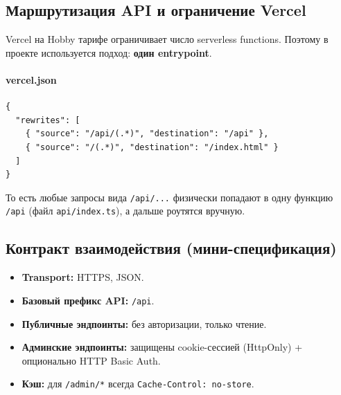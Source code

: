 \documentclass[12pt,a4paper]{article}
\begin{document}
\begin{center}
\end{center}

\subsection{Маршрутизация API и ограничение Vercel}
Vercel на Hobby тарифе ограничивает число serverless functions. Поэтому в проекте используется подход: \textbf{один entrypoint}.

\paragraph{vercel.json}
\begin{verbatim}
{
  "rewrites": [
    { "source": "/api/(.*)", "destination": "/api" },
    { "source": "/(.*)", "destination": "/index.html" }
  ]
}
\end{verbatim}

То есть любые запросы вида \texttt{/api/...} физически попадают в одну функцию \texttt{/api} (файл \texttt{api/index.ts}), а дальше роутятся вручную.

\subsection{Контракт взаимодействия (мини-спецификация)}
\begin{itemize}[leftmargin=18pt]
  \item \textbf{Transport:} HTTPS, JSON.
  \item \textbf{Базовый префикс API:} \texttt{/api}.
  \item \textbf{Публичные эндпоинты:} без авторизации, только чтение.
  \item \textbf{Админские эндпоинты:} защищены cookie-сессией (HttpOnly) + опционально HTTP Basic Auth.
  \item \textbf{Кэш:} для \texttt{/admin/*} всегда \texttt{Cache-Control: no-store}.
\end{itemize}
\end{document}
